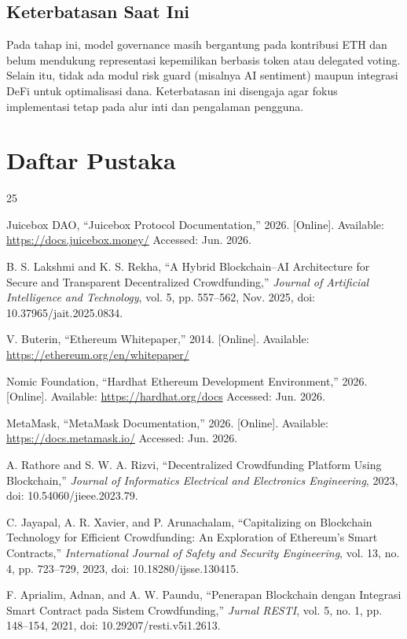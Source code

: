 \documentclass[12pt]{article}
\begin{document}
\subsection{Keterbatasan Saat Ini}
Pada tahap ini, model governance masih bergantung pada kontribusi ETH dan belum mendukung representasi kepemilikan berbasis token atau delegated voting. Selain itu, tidak ada modul risk guard (misalnya AI sentiment) maupun integrasi DeFi untuk optimalisasi dana. Keterbatasan ini disengaja agar fokus implementasi tetap pada alur inti dan pengalaman pengguna.

\section*{Daftar Pustaka}
\begin{thebibliography}{25}

Juicebox DAO, ``Juicebox Protocol Documentation,'' 2026. [Online]. Available: \url{https://docs.juicebox.money/} Accessed: Jun. 2026.

B. S. Lakshmi and K. S. Rekha, ``A Hybrid Blockchain--AI Architecture for Secure and Transparent Decentralized Crowdfunding,'' \textit{Journal of Artificial Intelligence and Technology}, vol. 5, pp. 557--562, Nov. 2025, doi: 10.37965/jait.2025.0834.

V. Buterin, ``Ethereum Whitepaper,'' 2014. [Online]. Available: \url{https://ethereum.org/en/whitepaper/}

Nomic Foundation, ``Hardhat Ethereum Development Environment,'' 2026. [Online]. Available: \url{https://hardhat.org/docs} Accessed: Jun. 2026.

MetaMask, ``MetaMask Documentation,'' 2026. [Online]. Available: \url{https://docs.metamask.io/} Accessed: Jun. 2026.

A. Rathore and S. W. A. Rizvi, ``Decentralized Crowdfunding Platform Using Blockchain,'' \textit{Journal of Informatics Electrical and Electronics Engineering}, 2023, doi: 10.54060/jieee.2023.79.

C. Jayapal, A. R. Xavier, and P. Arunachalam, ``Capitalizing on Blockchain Technology for Efficient Crowdfunding: An Exploration of Ethereum's Smart Contracts,'' \textit{International Journal of Safety and Security Engineering}, vol. 13, no. 4, pp. 723--729, 2023, doi: 10.18280/ijsse.130415.

F. Aprialim, Adnan, and A. W. Paundu, ``Penerapan Blockchain dengan Integrasi Smart Contract pada Sistem Crowdfunding,'' \textit{Jurnal RESTI}, vol. 5, no. 1, pp. 148--154, 2021, doi: 10.29207/resti.v5i1.2613.


\end{thebibliography}
\end{document}
